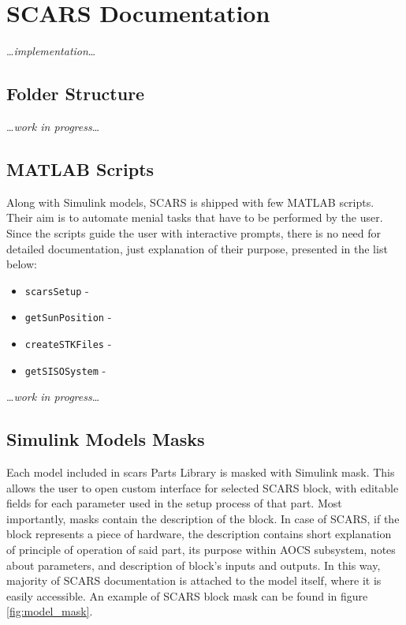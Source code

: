 \section{SCARS Documentation}\label{sec:documentation}
    \dots\textit{implementation}\dots
    


    \subsection{Folder Structure}
        \dots\textit{work in progress}\dots
    


    \subsection{MATLAB Scripts}
        Along with Simulink models, SCARS is shipped with few MATLAB scripts. Their aim is to automate menial tasks that have to be performed by the user. Since the scripts guide the user with interactive prompts, there is no need for detailed documentation, just explanation of their purpose, presented in the list below:
        \begin{itemize}
            \item \verb|scarsSetup| - 
            \item \verb|getSunPosition| - 
            \item \verb|createSTKFiles| - 
            \item \verb|getSISOSystem| - 
        \end{itemize}
        
        \dots\textit{work in progress}\dots



    \subsection{Simulink Models Masks}
        Each model included in \ac{scars} Parts Library is masked with Simulink mask\cite{masks}. This allows the user to open custom interface for selected SCARS block, with editable fields for each parameter used in the setup process of that part. Most importantly, masks contain the description of the block. In case of SCARS, if the block represents a piece of hardware, the description contains short explanation of principle of operation of said part, its purpose within AOCS subsystem, notes about parameters, and description of block's inputs and outputs. In this way, majority of SCARS documentation is attached to the model itself, where it is easily accessible. An example of SCARS block mask can be found in figure \autoref{fig:model_mask}.
        
